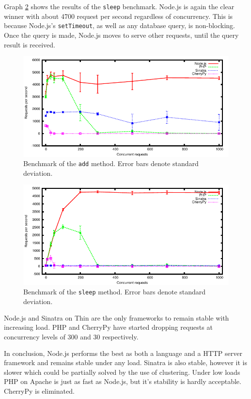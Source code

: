\documentclass[12pt,oneside]{fithesis}
\begin{document}
		Graph \ref{fig:bench_sleep} shows the results of the \texttt{sleep} benchmark. Node.js is again the clear winner with about 4700 request per second regardless of concurrency. This is because Node.js's \texttt{setTimeout}, as well as any database query, is non-blocking. Once the query is made, Node.js moves to serve other requests, until the query result is received.
		
		\begin{figure}[h]
	  \centering
	    \includegraphics[width=1.0\textwidth]{plot_add.pdf}
		  \caption{Benchmark of the \texttt{add} method. Error bars denote standard deviation.}
		  \label{fig:bench_add}
		\end{figure}		
		\begin{figure}[h]
	  \centering
	    \includegraphics[width=1.0\textwidth]{plot_sleep.pdf}
		  \caption{Benchmark of the \texttt{sleep} method. Error bars denote standard deviation.}
		  \label{fig:bench_sleep}
		\end{figure}
		
		Node.js and Sinatra on Thin are the only frameworks to remain stable with increasing load. PHP and CherryPy have started dropping requests at concurrency levels of 300 and 30 respectively.
				
		In conclusion, Node.js performs the best as both a language and a HTTP server framework and remains stable under any load. Sinatra is also stable, however it is slower which could be partially solved by the use of clustering. Under low loads PHP on Apache is just as fast as Node.js, but it's stability is hardly acceptable. CherryPy is eliminated.
		
\end{document}
